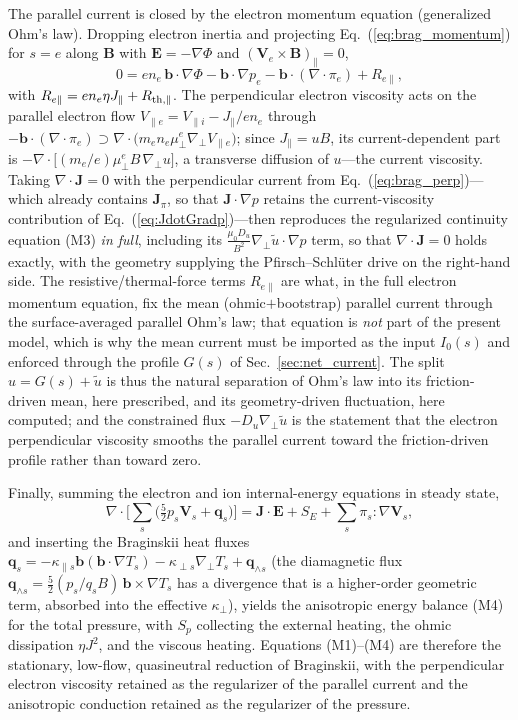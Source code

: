 \documentclass[english]{article}
\newcommand{\bB}{\mathbf{B}}
\newcommand{\bJ}{\mathbf{J}}
\newcommand{\bb}{\mathbf{b}}
\newcommand{\bE}{\mathbf{E}}
\newcommand{\bV}{\mathbf{V}}
\newcommand{\gradperp}{\nabla_{\!\perp}}
\begin{document}
The parallel current is closed by the electron momentum equation (generalized Ohm's law). Dropping
electron inertia and projecting Eq.~(\ref{eq:brag_momentum}) for $s=e$ along $\bB$ with
$\bE=-\nabla\Phi$ and $(\bV_e\times\bB)_\parallel=0$,
\begin{equation}
0=e n_e\,\bb\cdot\nabla\Phi-\bb\cdot\nabla p_e
-\bb\cdot(\nabla\cdot\pi_e)+R_{e\parallel} ,
\label{eq:parallel_ohm}
\end{equation}
with $R_{e\parallel}=en_e\eta J_\parallel+R_{\rm th,\parallel}$. The perpendicular electron
viscosity acts on the parallel electron flow $V_{\parallel e}=V_{\parallel i}-J_\parallel/en_e$
through $-\bb\cdot(\nabla\cdot\pi_e)\supset\nabla\cdot\!\big(m_en_e\mu_\perp^e\gradperp
V_{\parallel e}\big)$; since $J_\parallel=uB$, its current-dependent part is
$-\nabla\cdot\!\big[(m_e/e)\mu_\perp^e B\,\gradperp u\big]$, a transverse diffusion of $u$---the
current viscosity. Taking $\nabla\cdot\bJ=0$ with the perpendicular current from
Eq.~(\ref{eq:brag_perp})---which already contains $\bJ_\pi$, so that $\bJ\cdot\nabla p$ retains the
current-viscosity contribution of Eq.~(\ref{eq:JdotGradp})---then reproduces the regularized
continuity equation (M3) \emph{in full}, including its
$\tfrac{\mu_0 D_u}{B^{2}}\gradperp\tilde u\cdot\nabla p$ term, so that $\nabla\cdot\bJ=0$ holds
exactly, with the geometry supplying the Pfirsch--Schl\"uter drive on the right-hand side. The
resistive/thermal-force terms $R_{e\parallel}$ are what, in the full electron momentum equation,
fix the mean (ohmic$+$bootstrap) parallel current through the surface-averaged parallel Ohm's law;
that equation is \emph{not} part of the present model, which is why the mean current must be
imported as the input $I_0(s)$ and enforced through the profile $G(s)$ of
Sec.~\ref{sec:net_current}. The split $u=G(s)+\tilde u$ is thus the natural separation of Ohm's
law into its friction-driven mean, here prescribed, and its geometry-driven fluctuation, here
computed; and the constrained flux $-D_u\gradperp\tilde u$ is the statement that the electron
perpendicular viscosity smooths the parallel current toward the friction-driven profile rather than
toward zero.

Finally, summing the electron and ion internal-energy equations in steady state,
\begin{equation}
\nabla\cdot\Big[\sum_s\big(\tfrac52 p_s\bV_s+\mathbf{q}_s\big)\Big]
=\bJ\cdot\bE+S_E+\sum_s\pi_s\!:\!\nabla\bV_s ,
\label{eq:brag_energy}
\end{equation}
and inserting the Braginskii heat fluxes $\mathbf{q}_s=-\kappa_{\parallel s}\bb(\bb\cdot\nabla T_s)
-\kappa_{\perp s}\gradperp T_s+\mathbf{q}_{\wedge s}$ (the diamagnetic flux $\mathbf{q}_{\wedge s}
=\tfrac52(p_s/q_sB)\,\bb\times\nabla T_s$ has a divergence that is a higher-order geometric term,
absorbed into the effective $\kappa_\perp$), yields the anisotropic energy balance (M4) for the
total pressure, with $S_p$ collecting the external heating, the ohmic dissipation $\eta J^{2}$, and
the viscous heating. Equations (M1)--(M4) are therefore the stationary, low-flow, quasineutral
reduction of Braginskii, with the perpendicular electron viscosity retained as the regularizer of
the parallel current and the anisotropic conduction retained as the regularizer of the pressure.
\end{document}
